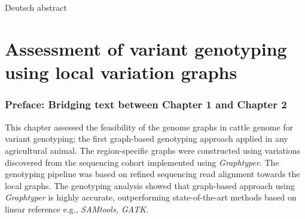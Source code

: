 \documentclass[11 pt, a4paper, notitlepage, twoside]{report}
\begin{document}
\newpage

\thispagestyle{plain}
\section*{}

Deutsch abstract

\iftwoside
\cleardoublepage
\newpage
\fi

\newpage



\onehalfspacing


\chapter[Feasibility of the bovine genome graphs]{\LARGE{Assessment of variant genotyping using local variation graphs}}
\label{chap:locgraph}
\subsection*{Preface: Bridging text between Chapter 1 and Chapter 2}
\onehalfspacing
\normalsize
This chapter assessed the feasibility of the genome graphs in cattle genome for variant genotyping; the first graph-based genotyping approach applied in any agricultural animal. The region-specific graphs were constructed using variations discovered from the sequencing cohort implemented using \emph{Graphtyper}. The genotyping pipeline was based on refined sequencing read alignment towards the local graphs. The genotyping analysis showed that graph-based approach using \textit{Graphtyper} is highly accurate, outperforming state-of-the-art methods based on linear reference e.g., \textit{SAMtools, \emph{GATK}}. \\

\bigskip

\end{document}
